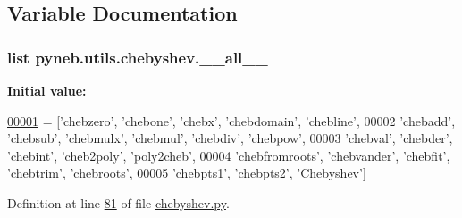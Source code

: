 \subsection{Variable Documentation}
\hypertarget{namespacepyneb_1_1utils_1_1chebyshev_a9cb4e1ba55fc61d6dd46d5c6f534edbc}{}
\subsubsection[{\+\_\+\+\_\+all\+\_\+\+\_\+}]{\setlength{\rightskip}{0pt plus 5cm}list pyneb.\+utils.\+chebyshev.\+\_\+\+\_\+all\+\_\+\+\_\+}\label{namespacepyneb_1_1utils_1_1chebyshev_a9cb4e1ba55fc61d6dd46d5c6f534edbc}
{\bfseries Initial value\+:}
\begin{DoxyCode}
\hypertarget{namespacepyneb_1_1utils_1_1chebyshev_l00001}{}\hyperlink{namespacepyneb_1_1utils_1_1chebyshev}{00001} = [\textcolor{stringliteral}{'chebzero'}, \textcolor{stringliteral}{'chebone'}, \textcolor{stringliteral}{'chebx'}, \textcolor{stringliteral}{'chebdomain'}, \textcolor{stringliteral}{'chebline'},
00002         \textcolor{stringliteral}{'chebadd'}, \textcolor{stringliteral}{'chebsub'}, \textcolor{stringliteral}{'chebmulx'}, \textcolor{stringliteral}{'chebmul'}, \textcolor{stringliteral}{'chebdiv'}, \textcolor{stringliteral}{'chebpow'},
00003         \textcolor{stringliteral}{'chebval'}, \textcolor{stringliteral}{'chebder'}, \textcolor{stringliteral}{'chebint'}, \textcolor{stringliteral}{'cheb2poly'}, \textcolor{stringliteral}{'poly2cheb'},
00004         \textcolor{stringliteral}{'chebfromroots'}, \textcolor{stringliteral}{'chebvander'}, \textcolor{stringliteral}{'chebfit'}, \textcolor{stringliteral}{'chebtrim'}, \textcolor{stringliteral}{'chebroots'},
00005         \textcolor{stringliteral}{'chebpts1'}, \textcolor{stringliteral}{'chebpts2'}, \textcolor{stringliteral}{'Chebyshev'}]
\end{DoxyCode}


Definition at line \hyperlink{chebyshev_8py_source_l00081}{81} of file \hyperlink{chebyshev_8py_source}{chebyshev.\+py}.

\hypertarget{namespacepyneb_1_1utils_1_1chebyshev_a57e110567544748d0de429d3743d1241}{}
